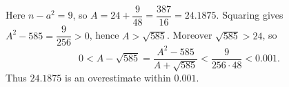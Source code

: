 Here $n-a^2=9$, so $A=24+\dfrac{9}{48}=\dfrac{387}{16}=24.1875$. Squaring gives $A^2-585=\dfrac{9}{256}>0$, hence $A>\sqrt{585}$. Moreover $\sqrt{585}>24$, so
\[0<A-\sqrt{585}=\dfrac{A^2-585}{A+\sqrt{585}}<\dfrac{9}{256\cdot48}<0.001.\]
Thus $\boxed{24.1875}$ is an overestimate within $0.001$.
